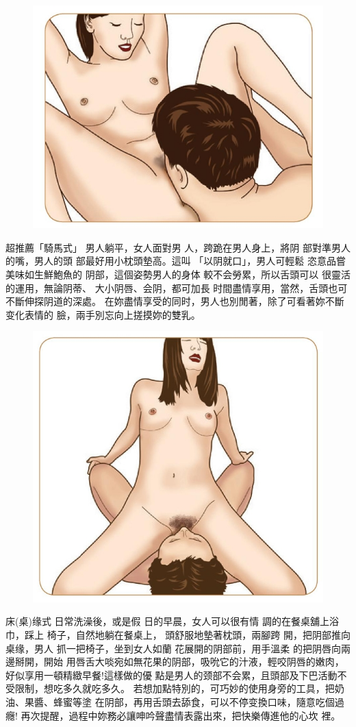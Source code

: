 \documentclass[12pt,UTF8]{ctexbook}
\begin{document}
\begin{figure}[htbp]
	\centering
	\includegraphics[width=0.7\linewidth]{21}
	\caption{}
	\label{fig:1}
\end{figure}

超推薦「騎馬式」
男人躺平，女人面對男
人，跨跪在男人身上，將阴
部對準男人的嘴，男人的頭
部最好用小枕頭墊高。這叫
「以阴就口」，男人可輕鬆
恣意品嘗美味如生鮮鮑魚的
阴部，這個姿勢男人的身体
較不会勞累，所以舌頭可以
很靈活的運用，無論阴蒂、
大小阴唇、会阴，都可加長
时間盡情享用，當然，舌頭也可不斷伸探阴道的深處。
在妳盡情享受的同时，男人也別閒著，除了可看著妳不斷变化表情的
臉，兩手別忘向上搓摸妳的雙乳。

\begin{figure}[htbp]
	\centering
	\includegraphics[width=0.7\linewidth]{22}
	\caption{}
	\label{fig:1}
\end{figure}

床(桌)缘式
日常洗澡後，或是假
日的早晨，女人可以很有情
調的在餐桌舖上浴巾，踩上
椅子，自然地躺在餐桌上，
頭舒服地墊著枕頭，兩腳跨
開，把阴部推向桌缘，男人
抓一把椅子，坐到女人如蘭
花展開的阴部前，用手溫柔
的把阴唇向兩邊掰開，開始
用唇舌大啖宛如無花果的阴部，吸吮它的汁液，輕咬阴唇的嫩肉，好似享用一頓精緻早餐!這樣做的優
點是男人的颈部不会累，且頭部及下巴活動不受限制，想吃多久就吃多久。
若想加點特別的，可巧妙的使用身旁的工具，把奶油、果醬、蜂蜜等塗
在阴部，再用舌頭去舔食，可以不停变換口味，隨意吃個過癮!
再次提醒，過程中妳務必讓呻吟聲盡情表露出來，把快樂傳進他的心坎
裡。
\end{document}

